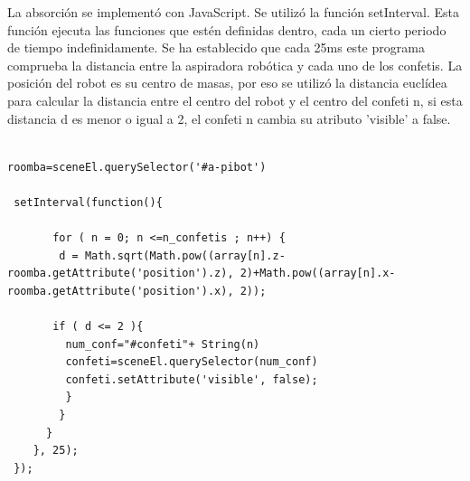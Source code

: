 La absorción se implementó con JavaScript. Se utilizó la función setInterval. Esta función ejecuta las funciones que estén definidas dentro, cada un cierto periodo de tiempo indefinidamente.
Se ha establecido que cada 25ms este programa comprueba la distancia entre la aspiradora robótica y cada uno de los confetis. La posición del robot es su centro de masas, por eso se  utilizó la distancia euclídea para calcular la distancia entre el centro del robot y el centro del confeti n, si esta distancia d es menor o igual a 2, el confeti n cambia su atributo 'visible' a false. 

\begin{lstlisting}

roomba=sceneEl.querySelector('#a-pibot')

 setInterval(function(){

       for ( n = 0; n <=n_confetis ; n++) {
        d = Math.sqrt(Math.pow((array[n].z-roomba.getAttribute('position').z), 2)+Math.pow((array[n].x-roomba.getAttribute('position').x), 2));

       if ( d <= 2 ){
         num_conf="#confeti"+ String(n)
         confeti=sceneEl.querySelector(num_conf)
         confeti.setAttribute('visible', false);
         }
        }
      }
    }, 25);
 });
\end{lstlisting}

